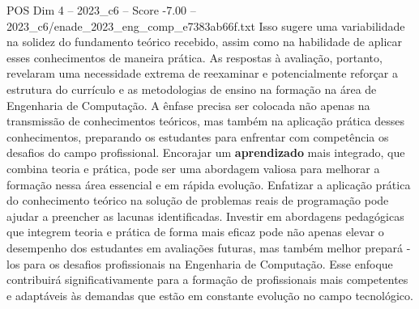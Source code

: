 \begin{textsample}{POS Dim 4 – 2023\_c6 – Score -7.00 – 2023\_c6/enade\_2023\_eng\_comp\_e7383ab66f.txt}
Isso sugere uma variabilidade na solidez do fundamento teórico recebido, assim como na habilidade de aplicar esses conhecimentos de maneira prática.
As respostas à avaliação, portanto, revelaram uma necessidade extrema de reexaminar e potencialmente reforçar a estrutura do currículo e as metodologias de ensino na formação na área de Engenharia de Computação.
A ênfase precisa ser colocada não apenas na transmissão de conhecimentos teóricos, mas também na aplicação prática desses conhecimentos, preparando os estudantes para enfrentar com competência os desafios do campo profissional.
Encorajar um \textbf{aprendizado} mais integrado, que combina teoria e prática, pode ser uma abordagem valiosa para melhorar a formação nessa área essencial e em rápida evolução.
Enfatizar a aplicação prática do conhecimento teórico na solução de problemas reais de programação pode ajudar a preencher as lacunas identificadas.
Investir em abordagens pedagógicas que integrem teoria e prática de forma mais eficaz pode não apenas elevar o desempenho dos estudantes em avaliações futuras, mas também melhor prepará -los para os desafios profissionais na Engenharia de Computação.
Esse enfoque contribuirá significativamente para a formação de profissionais mais competentes e adaptáveis às demandas que estão em constante evolução no campo tecnológico.

\end{textsample}
